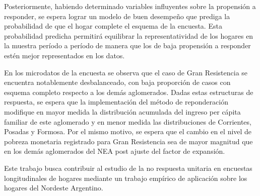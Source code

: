 \documentclass{article}
\begin{document}
Posteriormente, habiendo determinado variables influyentes sobre la propensión a responder, se espera lograr un modelo de buen desempeño que prediga la probabilidad de que el hogar complete el esquema de la encuesta. Esta probabilidad predicha permitirá equilibrar la representatividad de los hogares en la muestra período a período de manera que los de baja propensión a responder estén mejor representados en los datos.

En los microdatos de la encuesta se observa que el caso de Gran Resistencia se encuentra notablemente desbalanceado, con baja proporción de casos con esquema completo respecto a los demás aglomerados. Dadas estas estructuras de respuesta, se espera que la implementación del método de reponderación modifique en mayor medida la distribución acumulada del ingreso per cápita familiar de este aglomerado y en menor medida las distribuciones de Corrientes, Posadas y Formosa. Por el mismo motivo, se espera que el cambio en el nivel de pobreza monetaria registrado para Gran Resistencia sea de mayor magnitud que en los demás aglomerados del NEA post ajuste del factor de expansión.

Este trabajo busca contribuir al estudio de la no respuesta unitaria en encuestas longitudinales de hogares mediante un trabajo empírico de aplicación sobre los hogares del Nordeste Argentino.

\printbibliography
\end{document}
